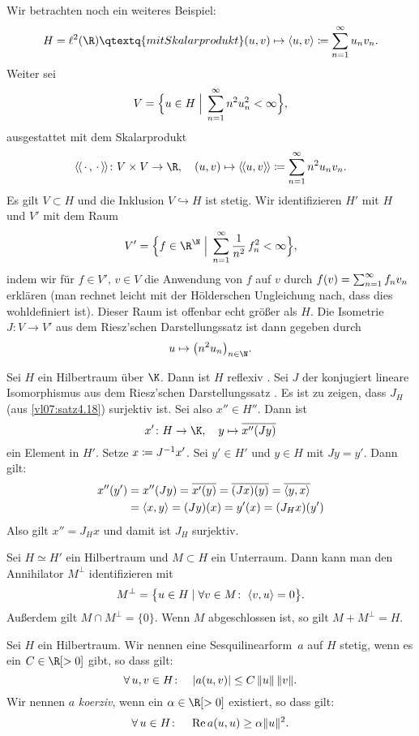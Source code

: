 Wir betrachten noch ein weiteres Beispiel:
\[ H = \ell^2(\R) \qtextq{mit Skalarprodukt}
    (u,v)\mapsto\SP{u,v}\defeq\nsum^\infty u_n v_n  
. \]
Weiter sei
\[ V = \Bigl\{ u\in H \;\Big\vert\; \sum_{n=1}^\infty n^2 u_n^2 < \infty \Bigr\}  , \]
ausgestattet mit dem Skalarprodukt
\[ \dSP{\scdot,\scdot}\colon V\times V\to\R, \quad
    (u,v)\mapsto \dSP{u,v} \defeq \nsum^\infty n^2 u_n v_n
. \]
Es gilt $V\subset H$ und die Inklusion $V\hookrightarrow H$ ist stetig.
Wir identifizieren $H'$ mit $H$ und $V'$ mit dem Raum
\[ V' = \Bigl\{ f\in\R^\N \cMid\Big
    \nsum^\infty \frac{1}{n^2}\, f_n^2 < \infty \Bigr\}
, \]
indem wir für $f\in V',\,v\in V$ die Anwendung von $f$ auf $v$ durch 
$f(v) = \sum_{n=1}^\infty f_n v_n$ erklären (man rechnet leicht mit der 
Hölderschen Ungleichung nach, dass dies wohldefiniert ist).
Dieser Raum ist offenbar echt größer als $H$. Die Isometrie $J\colon V\to V'$
aus dem Riesz'schen Darstellungssatz  ist dann gegeben durch 
\[ u \mapsto \bigl( n^2 u_n \bigr)_{n\in\N} . \]

\begin{thBemerkung}
    Sei $H$ ein Hilbertraum über $\K$. Dann ist $H$ reflexiv
    .
    Sei $J$ der konjugiert lineare
    Isomorphismus aus dem Riesz'schen Darstellungssatz .
    Es ist zu zeigen, dass $J_H$ (aus \cref{vl07:satz4.18}) surjektiv ist.
    Sei also $x''\in H''$. Dann ist
    \[ x'\colon H\to\K,\quad  y \mapsto  \ol{x''(Jy)} \]
    ein Element in $H'$. Setze $x \coloneqq J^{-1}x'$. Sei $y'\in H'$ und $y\in H$
    mit $Jy = y'$. Dann gilt:
    \begin{align*}
        x''(y') 
        &= x''(Jy) = \overline{x'(y)} = \overline{(Jx)(y)} = \overline{\left\langle y,x\right\rangle}  \\
        &= \left\langle x,y\right\rangle = (Jy)(x) = y'(x) = (J_Hx)(y')
    \end{align*}
    Also gilt $x'' = J_Hx$ und damit ist $J_H$ surjektiv.
\end{thBemerkung}

\begin{thBemerkung}
    Sei $H\simeq H'$ ein Hilbertraum und $M\subset H$ ein Unterraum. Dann kann
    man den Annihilator $M^\perp$ identifizieren mit
    \[ M^\perp = \bigl\{ u\in H \Mid \forall v\in M\colon\; \SP{v,u} = 0 \bigr\}
    . \]
    Außerdem gilt $M\cap M^\perp = \{0\}$. Wenn $M$ abgeschlossen ist, so gilt
    $M + M^\perp = H$.
\end{thBemerkung}

\begin{thDef} \label{vl13:def:sesquisetetigkorerziv}
    Sei $H$ ein Hilbertraum. Wir nennen eine Sesquilinearform~$a$ auf $H$
    stetig, wenn es ein $C\in\R[>0]$ gibt, so dass gilt: 
    \[ \forall\,u,v\in H\colon\quad \lvert a(u,v)\rvert \leq C \,\lVert u\rVert\,\lVert v\rVert  
    . \]
    Wir nennen $a$ \emph{koerziv}, wenn ein $\alpha\in\R[>0]$ existiert, so dass
    gilt:
    \[ \forall\,u\in H\colon\quad \operatorname{Re} a(u,u) \geq \alpha\lVert u\rVert^2  . \]
\end{thDef}

